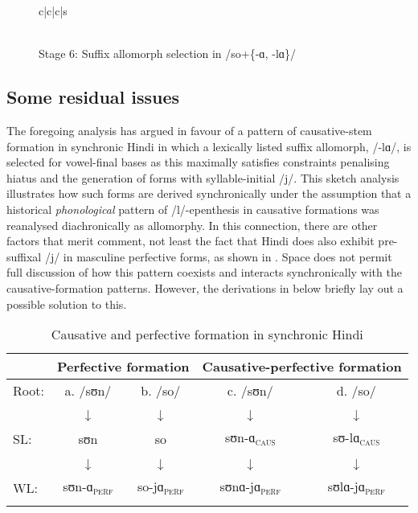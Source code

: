 \documentclass[output=paper,colorlinks,citecolor=brown]{langscibook}
\begin{document}
\begin{figure}
\caption{Stage 6: Suffix allomorph selection in /so+\{-ɑ, -lɑ\}/}
\label{a_la}
\begin{tableau}{c|c|c|s}
                 
            \vio{*!}   \vio{}      \vio{} \vio{}
           \vio{}     \vio{*!}   \vio{} \vio{}
 \vio{}     \vio{}      \vio{*!}  \vio{*}
\\
\hline
\\[-2em]
            \vio{*!}   \vio{}      \vio{} \vio{}
           \vio{}     \vio{*!}   \vio{} \vio{}
 \vio{}     \vio{}      \vio{}  \vio{*}
\end{tableau}
\end{figure}

\subsection{Some residual issues}
The foregoing analysis has argued in favour of a pattern of causative-stem formation in synchronic Hindi in which a lexically listed suffix allomorph, /-lɑ/, is selected for vowel-final bases as this maximally satisfies constraints penalising hiatus and the generation of forms with syllable-initial /j/. This sketch analysis illustrates how such forms are derived synchronically under the assumption that a historical \textit{phonological} pattern of /l/-epenthesis in causative formations was reanalysed diachronically as allomorphy. In this connection, there are other factors that merit comment, not least the fact that Hindi does also exhibit pre-suffixal /j/ in masculine perfective forms, as shown in . Space does not permit full discussion of how this pattern coexists and interacts synchronically with the causative-formation patterns.  However, the derivations in  below briefly lay out a possible solution to this.

\begin{table}
\caption{Causative and perfective formation in synchronic Hindi}
\label{caus_perf}
\begin{tabular}{lcccc}
\lsptoprule
 & \multicolumn{2}{c}{Perfective formation} & \multicolumn{2}{c}{Causative-perfective formation}\\\midrule
Root: & a. /sʊn/ & b. /so/ & c. /sʊn/ & d. /so/ \\
 & ↓ & ↓ & ↓ & ↓ \\
SL: & sʊn & so & sʊn-ɑ\textsubscript{\textsc{caus}} & sʊ-lɑ\textsubscript{\textsc{caus}} \\
 & ↓ & ↓ & ↓ & ↓ \\
WL: & sʊn-ɑ\textsubscript{\textsc{perf}} & so-jɑ\textsubscript{\textsc{perf}} & sʊnɑ-jɑ\textsubscript{\textsc{perf}} & sʊlɑ-jɑ\textsubscript{\textsc{perf}} \\
\lspbottomrule
\end{tabular}
\end{table}
\end{document}
